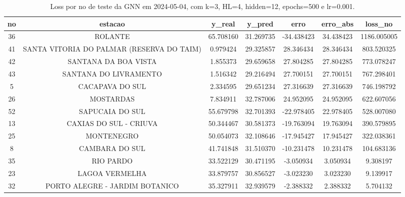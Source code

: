 \begin{table}[h]
\centering
\caption{Loss por no de teste da GNN em 2024-05-04, com k=3, HL=4, hidden=12, epochs=500 e lr=0.001.}
\label{tab:gnn_loss_k3_hl4_h12_e500_d20240504}
\begin{tabular}{ccccccc}
\toprule
no & estacao & y\_real & y\_pred & erro & erro\_abs & loss\_no \\
\midrule
36 & ROLANTE & 65.708160 & 31.269735 & -34.438423 & 34.438423 & 1186.005005 \\
41 & SANTA VITORIA DO PALMAR (RESERVA DO TAIM) & 0.979424 & 29.325857 & 28.346434 & 28.346434 & 803.520325 \\
42 & SANTANA DA BOA VISTA & 1.855373 & 29.659658 & 27.804285 & 27.804285 & 773.078247 \\
43 & SANTANA DO LIVRAMENTO & 1.516342 & 29.216494 & 27.700151 & 27.700151 & 767.298401 \\
5 & CACAPAVA DO SUL & 2.334595 & 29.651234 & 27.316639 & 27.316639 & 746.198792 \\
26 & MOSTARDAS & 7.834911 & 32.787006 & 24.952095 & 24.952095 & 622.607056 \\
52 & SAPUCAIA DO SUL & 55.679798 & 32.701393 & -22.978405 & 22.978405 & 528.007080 \\
13 & CAXIAS DO SUL - CRIUVA & 50.344467 & 30.581373 & -19.763094 & 19.763094 & 390.579895 \\
25 & MONTENEGRO & 50.054073 & 32.108646 & -17.945427 & 17.945427 & 322.038361 \\
8 & CAMBARA DO SUL & 41.741848 & 31.510370 & -10.231478 & 10.231478 & 104.683136 \\
35 & RIO PARDO & 33.522129 & 30.471195 & -3.050934 & 3.050934 & 9.308197 \\
23 & LAGOA VERMELHA & 33.879757 & 30.856527 & -3.023230 & 3.023230 & 9.139917 \\
32 & PORTO ALEGRE - JARDIM BOTANICO & 35.327911 & 32.939579 & -2.388332 & 2.388332 & 5.704132 \\
\bottomrule
\end{tabular}
\end{table}
